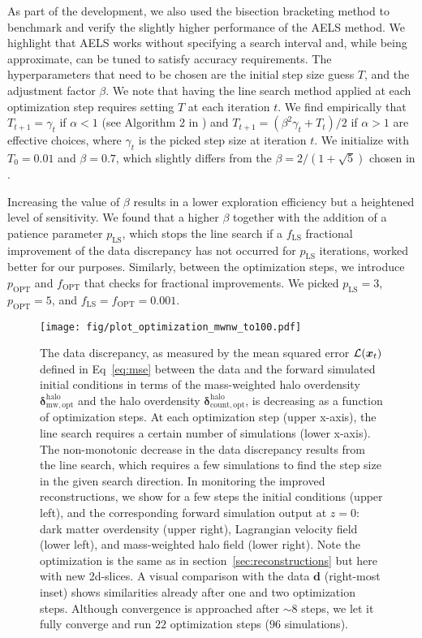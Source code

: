 As part of the development, we also used the bisection bracketing method to benchmark and verify the slightly higher performance of the AELS method. We highlight that AELS works without specifying a search interval and, while being approximate, can be tuned to satisfy accuracy requirements. The hyperparameters that need to be chosen are the initial step size guess $T$, and the adjustment factor $\beta$. We note that having the line search method applied at each optimization step requires setting $T$ at each iteration $t$. We find empirically that $T_{t+1} = \gamma_t$ if $\alpha < 1$ (see Algorithm 2 in \citet{Fridovich-Keil2020}) and $T_{t+1} =(\beta^2 \gamma_t + T_t)/2$ if $\alpha > 1$ are effective choices, where $\gamma_t$ is the picked step size at iteration $t$. We initialize with $T_0=0.01$ and $\beta = 0.7$, which slightly differs from the $\beta = 2/(1+\sqrt{5})$ chosen in \citet{Fridovich-Keil2020}. 

Increasing the value of $\beta$ results in a lower exploration efficiency but a heightened level of sensitivity. We found that a higher $\beta$ together with the addition of a patience parameter $p_{\mathrm{LS}}$, which stops the line search if a $f_{\mathrm{LS}}$ fractional improvement of the data discrepancy has not occurred for $p_{\mathrm{LS}}$ iterations, worked better for our purposes. Similarly, between the optimization steps, we introduce $p_{\mathrm{OPT}}$ and $f_{\mathrm{OPT}}$ that checks for fractional improvements. We picked $p_{\mathrm{LS}}=3$, $p_{\mathrm{OPT}}=5$, and $f_{\mathrm{LS}}=f_{\mathrm{OPT}}=0.001$. 

\renewcommand{\thefigure}{ C\arabic{figure}}
\begin{figure*}
    \centering
    \texttt{[image: fig/plot\_optimization\_mwnw\_to100.pdf]}
    \vspace{-1em}
    \caption{The data discrepancy, as measured by the mean squared error $\mathcal{L}(\boldsymbol{x}_t)$ defined in Eq~\eqref{eq:mse} between the data and the forward simulated initial conditions in terms of the mass-weighted halo overdensity $\boldsymbol{\delta}_{\mathrm{mw,opt}}^{\mathrm{halo}}$ and the halo overdensity $\boldsymbol{\delta}_{\mathrm{count,opt}}^{\mathrm{halo}}$, is decreasing as a function of optimization steps. At each optimization step (upper x-axis), the line search requires a certain number of simulations (lower x-axis). The non-monotonic decrease in the data discrepancy results from the line search, which requires a few simulations to find the step size in the given search direction. In monitoring the improved reconstructions, we show for a few steps the initial conditions (upper left), and the corresponding forward simulation output at $z=0$: dark matter overdensity (upper right), Lagrangian velocity field (lower left), and mass-weighted halo field (lower right). Note the optimization is the same as in section~\ref{sec:reconstructions} but here with new 2d-slices. A visual comparison with the data $\mathbf{d}$ (right-most inset) shows similarities already after one and two optimization steps. Although convergence is approached after $\sim 8$ steps, we let it fully converge and run $22$ optimization steps ($96$ simulations).}
    \label{fig:opt_process}
\end{figure*}

